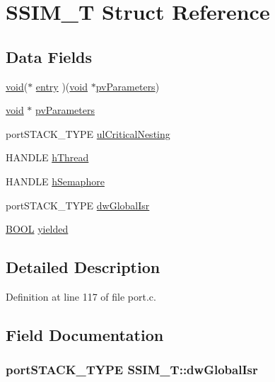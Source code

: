 \hypertarget{struct_s_s_i_m___t}{\section{S\-S\-I\-M\-\_\-\-T Struct Reference}
\label{struct_s_s_i_m___t}
}
\subsection*{Data Fields}
\begin{DoxyCompactItemize}
\item 
\hyperlink{group___n_a_m_e_ga18028b8badbf1ea7e704ccac3c488e82}{void}($\ast$ \hyperlink{struct_s_s_i_m___t_a53042065d3c3ce9a5c6578c26f489e5c}{entry} )(\hyperlink{group___n_a_m_e_ga18028b8badbf1ea7e704ccac3c488e82}{void} $\ast$\hyperlink{struct_s_s_i_m___t_a729718329892b37a37975fee9b3df407}{pv\-Parameters})
\item 
\hyperlink{group___n_a_m_e_ga18028b8badbf1ea7e704ccac3c488e82}{void} $\ast$ \hyperlink{struct_s_s_i_m___t_a729718329892b37a37975fee9b3df407}{pv\-Parameters}
\item 
port\-S\-T\-A\-C\-K\-\_\-\-T\-Y\-P\-E \hyperlink{struct_s_s_i_m___t_ac257dec6e7fce94889583a6867cdd7c6}{ul\-Critical\-Nesting}
\item 
H\-A\-N\-D\-L\-E \hyperlink{struct_s_s_i_m___t_a26a83dec0b9880466e5fcd8bc3f1757e}{h\-Thread}
\item 
H\-A\-N\-D\-L\-E \hyperlink{struct_s_s_i_m___t_a09cc61d8abc88e8e4f0f07c5b3d4092f}{h\-Semaphore}
\item 
port\-S\-T\-A\-C\-K\-\_\-\-T\-Y\-P\-E \hyperlink{struct_s_s_i_m___t_acb13aeb7baaf0520a761692c747a4293}{dw\-Global\-Isr}
\item 
\hyperlink{win32_2win32_2_libraries_2_free_r_t_o_s_2_source_2portable_2_g_c_c_2_win32_2port_8c_a7ca02251638f0223f68659d45476edb2}{B\-O\-O\-L} \hyperlink{struct_s_s_i_m___t_aa951f32f4bd9ed9194b75e31c8a98a48}{yielded}
\end{DoxyCompactItemize}


\subsection{Detailed Description}


Definition at line 117 of file port.\-c.



\subsection{Field Documentation}
\hypertarget{struct_s_s_i_m___t_acb13aeb7baaf0520a761692c747a4293}{
\subsubsection[{dw\-Global\-Isr}]{\setlength{\rightskip}{0pt plus 5cm}port\-S\-T\-A\-C\-K\-\_\-\-T\-Y\-P\-E S\-S\-I\-M\-\_\-\-T\-::dw\-Global\-Isr}}\label{struct_s_s_i_m___t_acb13aeb7baaf0520a761692c747a4293}


